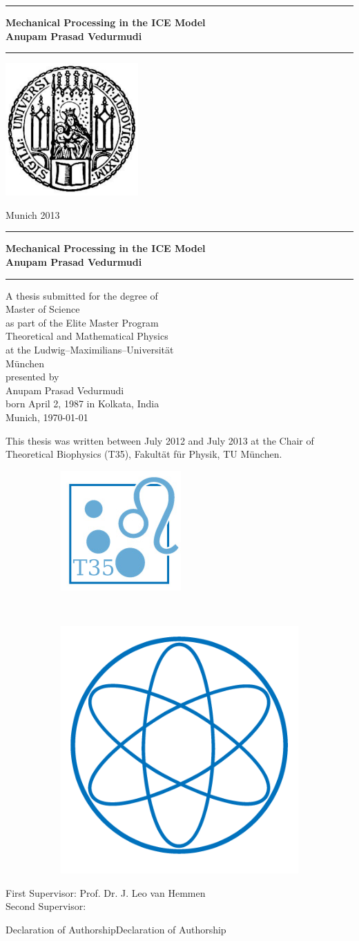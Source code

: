 \documentclass[12pt]{book}
\newcommand{\LMUTitle}[9]{
  \thispagestyle{empty}
  \vspace*{\stretch{1}}
  {\parindent0cm
   \rule{\linewidth}{.7ex}}
  \begin{flushright}

    \vspace*{\stretch{1}}
    \sffamily\bfseries\Huge
    #1\\
    \vspace*{\stretch{1}}
    \sffamily\bfseries\large
    #2
    \vspace*{\stretch{1}}
  \end{flushright}
  \rule{\linewidth}{.7ex}
  \vspace*{\stretch{5}}
  \begin{center}
    \includegraphics[width=2in]{siegel}
  \end{center}
  \vspace*{\stretch{1}}
  \begin{center}\sffamily\LARGE{#5}\end{center}
  \newpage
  \thispagestyle{empty}

  \cleardoublepage
  \thispagestyle{empty}

  \vspace*{\stretch{1}}
  {\parindent0cm
  \rule{\linewidth}{.7ex}}
  \begin{flushright}
    \vspace*{\stretch{1}}	
    \sffamily\bfseries\Huge
    #1\\
    \vspace*{\stretch{1}}
    \sffamily\bfseries\large
    #2
    \vspace*{\stretch{1}}
  \end{flushright}
  \rule{\linewidth}{.7ex}

  \vspace*{\stretch{3}}
  \begin{center}
      A thesis submitted for the degree of\\
      Master of Science\\
      as part of the Elite Master Program\\
      Theoretical and Mathematical Physics\\
      at the Ludwig--Maximilians--Universit\"{a}t\\
      M\"unchen\\
    \vspace*{\stretch{1}}
      presented by\\
      #2\\
      born April 2, 1987 in #3\\
    \vspace*{\stretch{2}}
      Munich, #6
  \end{center}

  \newpage
  \thispagestyle{empty}
  \noindent This thesis was written between July 2012 and July 2013 at the Chair of Theoretical Biophysics (T35), Fakult\"{a}t f\"{u}r Physik, TU M\"{u}nchen.\\
  \vspace*{\stretch{1}}  
  \begin{figure}[htb!]
        \begin{subfigure}[b]{.5\textwidth}
         \flushleft
                \includegraphics[width=.3\textwidth]{Diagrams/T35logo2.png}
        \end{subfigure}%
        ~ %
        \begin{subfigure}[b]{0.5\textwidth}
        \flushright
                \includegraphics[width=.3\textwidth]{Diagrams/physik_logo2.png}
        \end{subfigure}
\end{figure}

  \begin{flushleft}
    \large First Supervisor:  #7 \\[1mm]
    \large Second Supervisor: #8 \\[1mm]
  \end{flushleft}

  \cleardoublepage
}
\begin{document}
  \frontmatter


  \LMUTitle
      {Mechanical Processing in the ICE Model
       }               %
      {Anupam Prasad Vedurmudi}                      %
      {Kolkata, India}                             %
      {Faculty of Physics}                         %
      {Munich 2013}                          %
      {\today}                            %
      {Prof. Dr. J. Leo van Hemmen}                          %
      {}                         %

 
 \markboth{Declaration of Authorship}{Declaration of Authorship}
 
 
 
 
 
  \tableofcontents


  \listoffigures


  \listoftables
  \cleardoublepage

  


  \mainmatter\setcounter{page}{1}
  
  
  
   

  
%  
 

  \backmatter
  
  \markboth{}{}

%  
%  
\end{document}
